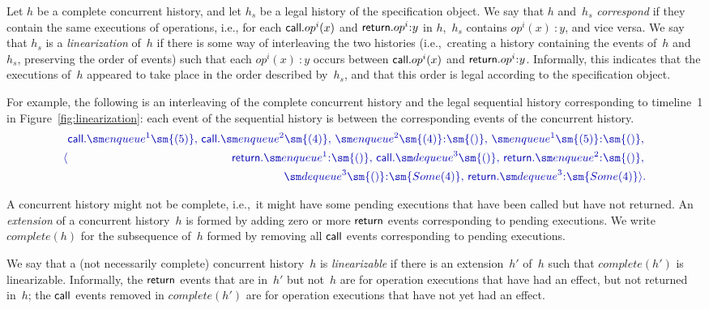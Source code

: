 Let $h$ be a complete concurrent history, and let $h_s$ be a legal history of
the specification object.  We say that $h$ and~$h_s$ \emph{correspond} if they
contain the same executions of operations, i.e., for each $\mathsf{call}.op^i(x)$ and
$\return.op^i\::y$ in $h$,\, $h_s$ contains $op^i(x)\::y$, and vice versa.  We
say that $h_s$ is a \emph{linearization} of~$h$ if there is some way of
interleaving the two histories (i.e.,~creating a history containing the events
of~$h$ and~$h_s$, preserving the order of events) such that each $op^i(x)\::y$
occurs between $\mathsf{call}.op^i(x)$ and $\return.op^i\::y$.  Informally, this
indicates that the executions of~$h$ appeared to take place in the order
described by~$h_s$, and that this order is legal according to the
specification object.

For example, the following is an interleaving of the complete concurrent
history and the legal sequential history corresponding to timeline~1 in
Figure~\ref{fig:linearization}: each event of the sequential history is
between the corresponding events of the concurrent history. 
\[\mstyle
\langle
  \begin{align}
  \call.\enqueue^1\sm{(5)},\, \call.\enqueue^2\sm{(4)},\,  
  \enqueue^2\sm{(4)}\::\sm{()},\,
  \enqueue^1\sm{(5)}\::\sm{()},\, \\
\quad
  \return.\enqueue^1\::\sm{()}, \,
  \call.\dequeue^3\sm{()},\, \return.\enqueue^2\::\sm{()},\, \\
\quad
  \dequeue^3\sm{()}\::\sm{Some(4)},\,
  \return.\dequeue^3\::\sm{Some(4)} \rangle .
  \end{align}
\]

A concurrent history might not be complete, i.e.,~it might have some pending
executions that have been called but have not returned.  An \emph{extension}
of a concurrent history~$h$ is formed by adding zero or more $\mathsf{return}$ events
corresponding to pending executions.  We write $complete(h)$ for the
subsequence of~$h$ formed by removing all $\mathsf{call}$ events corresponding to
pending executions.

We say that a (not necessarily complete) concurrent history~$h$ is
\emph{linearizable} if there is an extension~$h'$ of~$h$ such that
$complete(h')$ is linearizable.  Informally, the $\mathsf{return}$ events that are
in~$h'$ but not~$h$ are for operation executions that have had an effect, but
not returned in~$h$; the $\mathsf{call}$ events removed in $complete(h')$ are for
operation executions that have not yet had an effect.

